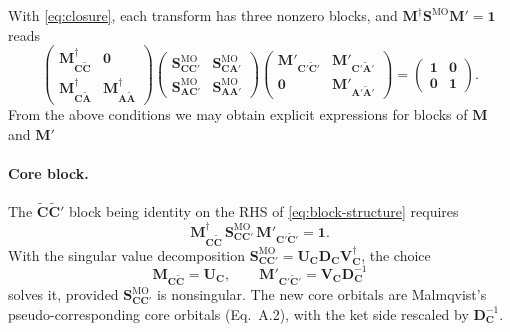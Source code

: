 \documentclass[aip,jcp,preprint]{revtex4-1}
\newcommand{\bvec}[1]{\mathbf{#1}}
\newcommand{\SMO}{\bvec{S}^{\mathrm{MO}}}
\begin{document}
With \cref{eq:closure}, each transform has three nonzero blocks, and $\bvec{M}^\dagger\SMO\bvec{M}' = \bvec{1}$ reads
\begin{equation}
 \begin{pmatrix}
  \bvec{M}_{\bvec{C}\tilde{\bvec{C}}}^\dagger & \bvec{0} \\
  \bvec{M}_{\bvec{C}\tilde{\bvec{A}}}^\dagger &
  \bvec{M}_{\bvec{A}\tilde{\bvec{A}}}^\dagger
 \end{pmatrix}
 \begin{pmatrix}
  \SMO_{\bvec{C}\bvec{C}'} & \SMO_{\bvec{C}\bvec{A}'} \\
  \SMO_{\bvec{A}\bvec{C}'} & \SMO_{\bvec{A}\bvec{A}'}
 \end{pmatrix}
 \begin{pmatrix}
  \bvec{M}'_{\bvec{C}'\tilde{\bvec{C}}'} & \bvec{M}'_{\bvec{C}'\tilde{\bvec{A}}'} \\
  \bvec{0} & \bvec{M}'_{\bvec{A}'\tilde{\bvec{A}}'}
 \end{pmatrix}
 =
 \begin{pmatrix} \bvec{1} & \bvec{0} \\ \bvec{0} & \bvec{1} \end{pmatrix}.
 \label{eq:block-structure}
\end{equation}
From the above conditions we may obtain explicit expressions for blocks of $\bvec{M}$ and $\bvec{M}'$

\paragraph{Core block.}
The $\tilde{\bvec{C}}\tilde{\bvec{C}}'$ block being identity on the RHS of \cref{eq:block-structure} requires
\begin{equation}
 \bvec{M}_{\bvec{C}\tilde{\bvec{C}}}^\dagger\, \SMO_{\bvec{C}\bvec{C}'}\,
 \bvec{M}'_{\bvec{C}'\tilde{\bvec{C}}'} = \bvec{1}.
 \label{eq:core-cond}
\end{equation}
With the singular value decomposition $\SMO_{\bvec{C}\bvec{C}'} = \bvec{U}_{\bvec{C}}\bvec{D}_{\bvec{C}}\bvec{V}_{\bvec{C}}^\dagger$, the choice
\begin{equation}
 \bvec{M}_{\bvec{C}\tilde{\bvec{C}}} = \bvec{U}_{\bvec{C}},
 \qquad
 \bvec{M}'_{\bvec{C}'\tilde{\bvec{C}}'} =
 \bvec{V}_{\bvec{C}}\bvec{D}_{\bvec{C}}^{-1}
 \label{eq:core-blocks}
\end{equation}
solves it, provided $\SMO_{\bvec{C}\bvec{C}'}$ is nonsingular.
The new core orbitals are Malmqvist's pseudo-corresponding core orbitals (Eq.~A.2), with the ket side rescaled by $\bvec{D}_{\bvec{C}}^{-1}$.
\end{document}
